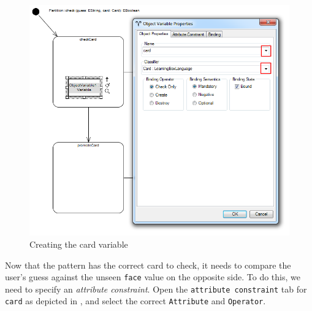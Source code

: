 \begin{stepbystep}
\begin{figure}[htbp]
\begin{center}
  \includegraphics[width=\textwidth]{../../org.moflon.doc.handbook.03_storyDiagrams/04_checkCard/visCheImages/ea_addObjVarCard}
  \caption{Creating the card variable}
  \label{ea:sdm_check_addCard}
\end{center}
\end{figure}

\clearpage

\item Now that the pattern has the correct card to check, it needs to compare the user's guess against the unseen \texttt{face} value on
the opposite side. To do this, we need to specify an \emph{attribute constraint}. Open the \texttt{attribute constraint} tab for \texttt{card} as depicted in
, and select the correct \texttt{Attribute} and \texttt{Operator}.

\vspace{0.5cm}


\end{stepbystep}
